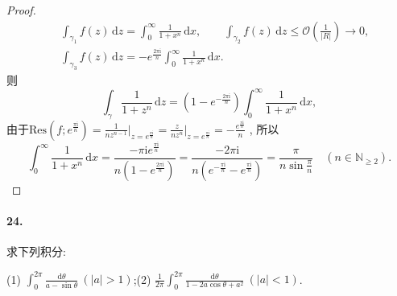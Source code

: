 \documentclass[12pt, a4paper, oneside]{ctexart}
\let\leq=\leqslant %
\let\geq=\geqslant %
\def\res{\text{Res}}
\def\N{\mathbb{N}}      %
\def\d{\mathrm{d}}      %
\def\i{\mathrm{i}}      %
\def\add{\vspace{1ex}}  %
\begin{document}
\begin{proof}
    \begin{align*}
        &\ \int_{\gamma_1} f(z)\,\d z = \int_{0}^\infty \frac{1}{1+x^n}\,\d x,\qquad \int_{\gamma_2}f(z)\,\d z\leq \mathcal{O}\left(\frac{1}{|R|}\right)\to 0,\\
        &\ \int_{\gamma_3} f(z)\,\d z = -e^{\frac{2\pi\i}{n}}\int_0^{\infty}\frac{1}{1+x^n}\,\d x.
    \end{align*}
    则
    \begin{equation*}
        \int_{\gamma}\frac{1}{1+z^n}\,\d z = \left(1-e^{-\frac{2\pi\i}{n}}\right)\int_0^{\infty}\frac{1}{1+x^n}\,\d x,
    \end{equation*}
    由于$\res\left(f;e^{\frac{\pi\i}{n}}\right) = \frac{1}{nz^{n-1}}\biggl|_{z=e^{\frac{\pi\i}{n}}} = \frac{z}{nz^{n}}\biggl|_{z=e^{\frac{\pi\i}{n}}} = -\frac{e^{\frac{\pi\i}{n}}}{n}$ , 所以
    \begin{equation*}
        \int_0^{\infty}\frac{1}{1+x^n}\,\d x = \frac{-\pi\i e^{\frac{\pi\i}{n}}}{n\left(1-e^{\frac{2\pi\i}{n}}\right)} = \frac{-2\pi\i}{n\left(e^{-\frac{\pi\i}{n}}-e^{\frac{\pi\i}{n}}\right)} = \frac{\pi}{n\sin\frac{\pi}{n}}\quad(n\in  \N_{\geq 2}).
    \end{equation*}
\end{proof}
\paragraph{24.}求下列积分:\add

(1) $\int_{0}^{2\pi}\frac{\d\theta}{a-\sin\theta}\ (|a| > 1)$;\qquad(2) $\frac{1}{2\pi}\int_0^{2\pi}\frac{\d \theta}{1-2a\cos\theta+a^2}\ (|a|<1)$.\add
\end{document}
